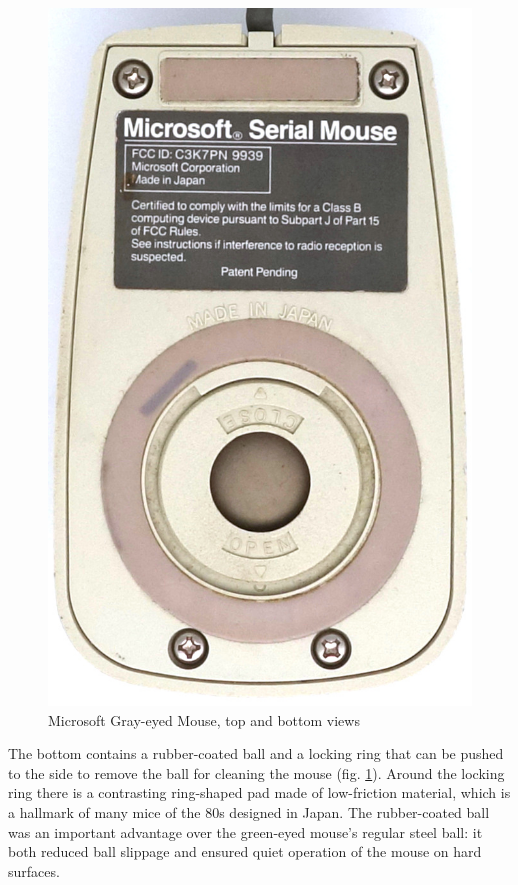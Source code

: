 \documentclass[11pt, a4paper]{article}
\begin{document}
\begin{figure}[h]
    \includegraphics[scale=0.6]{1985_microsoft_gray_eyed_mouse/bottom_30.jpg}
    \caption{Microsoft Gray-eyed Mouse, top and bottom views}
    \label{fig:MicrosoftGrayEyedTopAndBottom}
\end{figure}

The bottom contains a rubber-coated ball and a locking ring that can be pushed to the side to remove the ball for cleaning the mouse (fig. \ref{fig:MicrosoftGrayEyedTopAndBottom}). Around the locking ring there is a contrasting ring-shaped pad made of low-friction material, which is a hallmark of many mice of the 80s designed in Japan. The rubber-coated ball was an important advantage over the green-eyed mouse's regular steel ball: it both reduced ball slippage and ensured quiet operation of the mouse on hard surfaces.
\end{document}
